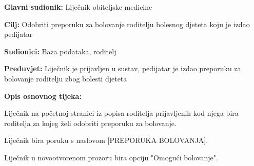 					
					
					\noindent {}
					\begin{packed_item}
						
						\item \textbf{Glavni sudionik: }Liječnik obiteljske medicine
						\item  \textbf{Cilj:} Odobriti preporuku za bolovanje roditelju bolesnog djeteta koju je izdao pedijatar
						\item  \textbf{Sudionici:} Baza podataka, roditelj
						\item  \textbf{Preduvjet:} Liječnik je prijavljen u sustav, pedijatar je izdao preporuku za bolovanje roditelju zbog bolesti djeteta
						\item  \textbf{Opis osnovnog tijeka:}
						
						\item[] \begin{packed_enum}
							
							\item Liječnik na početnoj stranici iz popisa roditelja prijavljenih kod njega bira roditelja za kojeg želi odobriti preporuku za bolovanje.
							\item Liječnik bira poruku s naslovom [PREPORUKA BOLOVANJA].
							\item Liječnik u novootvorenom prozoru bira opciju "Omogući bolovanje".
						\end{packed_enum}
						
						
						
					\end{packed_item}
					
